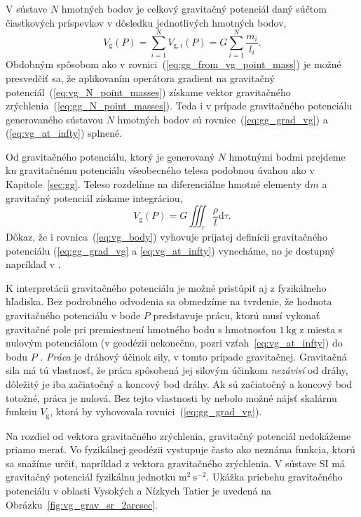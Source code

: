 \documentclass[a4paper, 12pt]{book}
\newcommand{\diff}{\mathrm d}
\newcommand{\gidx}{\mathrm g}
\begin{document}
V sústave $N$ hmotných bodov je celkový gravitačný potenciál daný súčtom 
čiastkových príspevkov v dôsledku jednotlivých hmotných bodov,
%
\begin{equation}
\label{eq:vg_N_point_masses}
V_\gidx(P) = \sum_{i = 1}^{N} V_{\gidx,i}(P) = G \sum_{i = 1}^{N}\frac{
m_i}{l_i}{.}
\end{equation}
%
Obdobným spôsobom ako v rovnici~(\ref{eq:gg_from_vg_point_mass}) je možné 
presvedčiť sa, že aplikovaním operátora gradient na gravitačný 
potenciál~(\ref{eq:vg_N_point_masses}) získame vektor gravitačného 
zrýchlenia~(\ref{eq:gg_N_point_masses}).  Teda i v prípade gravitačného 
potenciálu generovaného sústavou $N$ hmotných bodov sú 
rovnice~(\ref{eq:gg_grad_vg}) a (\ref{eq:vg_at_infty}) splnené.

Od gravitačného potenciálu, ktorý je generovaný $N$ hmotnými bodmi prejdeme ku 
gravitačnému potenciálu všeobecného telesa podobnou úvahou ako 
v Kapitole~\ref{sec:gg}.  Teleso rozdelíme na diferenciálne hmotné elementy 
$\diff m$ a gravitačný potenciál získame integráciou,
%
\begin{equation}
\label{eq:vg_body}
V_\gidx(P) = G \iiint_{\tau} \frac{\rho}{l} \diff\tau{.}
\end{equation}
%
Dôkaz, že i rovnica~(\ref{eq:vg_body}) vyhovuje prijatej definícii gravitačného 
potenciálu (\ref{eq:gg_grad_vg} a \ref{eq:vg_at_infty}) vynecháme, no je 
dostupný napríklad v \cite{MacMillan1930}.

K interpretácii gravitačného potenciálu je možné pristúpiť aj z fyzikálneho 
hľadiska.  Bez podrobného odvodenia sa obmedzíme na tvrdenie, že hodnota 
gravitačného potenciálu v bode $P$ predstavuje prácu, ktorú musí vykonať 
gravitačné pole pri premiestnení hmotného bodu s hmotnosťou $1\ \mathrm{kg}$ 
z miesta s nulovým potenciálom (v geodézii nekonečno, pozri 
vzťah~\ref{eq:vg_at_infty}) do bodu $P$ 
\citep{MacMillan1930,Kellogg1967,TorgeGeodesy}.  \emph{Práca} je dráhový účinok 
sily, v tomto prípade gravitačnej.  Gravitačná sila má tú vlastnosť, že práca 
spôsobená jej silovým účinkom \emph{nezávisí} od dráhy, dôležitý je iba 
začiatočný a koncový bod dráhy.  Ak sú začiatočný a koncový bod totožné, práca 
je nulová.  Bez tejto vlastnosti by nebolo možné nájsť skalárnu funkciu 
$V_\gidx$, ktorá by vyhovovala rovnici~(\ref{eq:gg_grad_vg}).

Na rozdiel od vektora gravitačného zrýchlenia, gravitačný potenciál nedokážeme 
priamo merať.  Vo fyzikálnej geodézii vystupuje často ako neznáma funkcia, 
ktorú sa snažíme určiť, napríklad z vektora gravitačného zrýchlenia.  V sústave 
SI má gravitačný potenciál fyzikálnu jednotku $\mathrm{m}^2\ \mathrm{s}^{-2}$.  
Ukážka priebehu gravitačného potenciálu v oblasti Vysokých a Nízkych Tatier je 
uvedená na Obrázku~\ref{fig:vg_grav_sr_2arcsec}.
\end{document}
